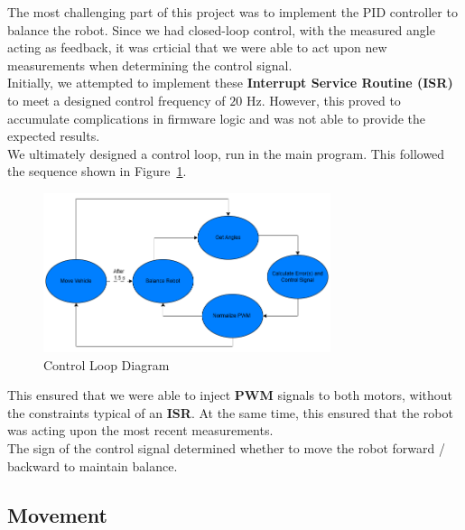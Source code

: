 \documentclass{article}
\begin{document}
\begin{minipage}{\linewidth}
    The most challenging part of this project was to implement the PID controller to balance the robot. Since we had closed-loop control,
    with the measured angle acting as feedback, it was crticial that we were able to act upon new measurements when determining the control signal. \\

    Initially, we attempted to implement these \textbf{Interrupt Service Routine (ISR)} to meet a designed control frequency of $20$ Hz.
    However, this proved to accumulate complications in firmware logic and was not able to provide the expected results. \\

    We ultimately designed a control loop, run in the main program. This followed the sequence shown in Figure~\ref{fig:control_loop_diagram}.
\end{minipage}

\begin{figure}[H]
    \centering
    \includegraphics[width=0.75\textwidth]{Figures/Control_Loop_Diagram.png}
    \caption{Control Loop Diagram}
    \label{fig:control_loop_diagram}
\end{figure}

\begin{minipage}{\linewidth}
    This ensured that we were able to inject \textbf{PWM} signals to both motors, without the constraints typical of an \textbf{ISR}. At the same time,
    this ensured that the robot was acting upon the most recent measurements. \\

    The sign of the control signal determined whether to move the robot forward / backward to maintain balance.
\end{minipage}

\subsection{Movement}
\label{sec:movement}
\end{document}
